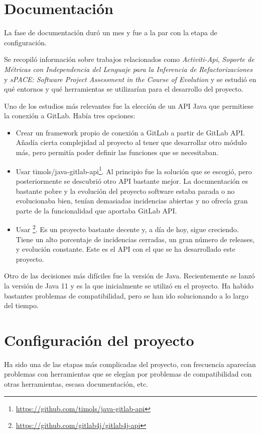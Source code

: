 \section{Documentación}
La fase de documentación duró un mes y fue a la par con la etapa de configuración. 

Se recopiló información sobre trabajos relacionados como \textit{Activiti-Api}\cite{rlp0019_software_2019}, \textit{Soporte de Métricas con Independencia del Lenguaje para la Inferencia de Refactorizaciones} \cite{marticorena_soporte_2005} y \textit{sPACE: Software Project Assessment in the Course of Evolution} \cite{ratzinger_space:_2007} y se estudió en qué entornos y qué herramientas se utilizarían para el desarrollo del proyecto.

Uno de los estudios más relevantes fue la elección de un API Java que permitiese la conexión a GitLab. Había tres opciones:
\begin{itemize}
	\item Crear un framework propio de conexión a GitLab a partir de GitLab API. Añadía cierta complejidad al proyecto al tener que desarrollar otro módulo más, pero permitía poder definir las funciones que se necesitaban.
	\item Usar timols/java-gitlab-api\footnote{\url{https://github.com/timols/java-gitlab-api}}\cite{olshansky_wrapper_2019}. Al principio fue la solución que se escogió, pero posteriormente se descubrió otro API bastante mejor. La documentación es bastante pobre y la evolución del proyecto software estaba parada o no evolucionaba bien, tenían demasiadas incidencias abiertas y no ofrecía gran parte de la funcionalidad que aportaba GitLab API.
	\item  Usar \footnote{\url{https://github.com/gitlab4j/gitlab4j-api}}\cite{noauthor_gitlab4j_2019}. Es un proyecto bastante decente y, a día de hoy, sigue creciendo. Tiene un alto porcentaje de incidencias cerradas, un gran número de releases, y evolución constante. Este es el API con el que se ha desarrollado este proyecto.
\end{itemize}
Otro de las decisiones más difíciles fue la versión de Java. Recientemente se lanzó la versión de Java 11 y es la que inicialmente se utilizó en el proyecto. Ha habido bastantes problemas de compatibilidad, pero se han ido solucionando a lo largo del tiempo.
\section{Configuración del proyecto}
Ha sido una de las etapas más complicadas del proyecto, con frecuencia aparecían problemas con herramientas que se elegían por problemas de compatibilidad con otras herramientas, escasa documentación, etc.

